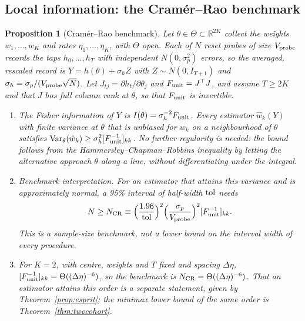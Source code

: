 \documentclass[12pt]{article}
\newtheorem{proposition}[theorem]{Proposition}
\theoremstyle{definition}
\theoremstyle{remark}
\newcommand{\R}{\mathbb{R}}
\begin{document}
\subsection{Local information: the Cram\'er--Rao benchmark}

\begin{proposition}[Cram\'er--Rao benchmark]\label{prop:crb}
Let $\theta\in\Theta\subset\R^{2K}$ collect the weights $w_1,\ldots,w_K$ and rates $\eta_1,\ldots,\eta_K$, with $\Theta$ open. Each of $N$ reset probes of size $V_{\rm probe}$ records the taps $h_0,\ldots,h_T$ with independent $N(0,\sigma_p^2)$ errors, so the averaged, rescaled record is $Y=h(\theta)+\sigma_hZ$ with $Z\sim N(0,I_{T+1})$ and $\sigma_h=\sigma_p/(V_{\rm probe}\sqrt N)$. Let $J_{tj}=\partial h_t/\partial\theta_j$ and $F_{\rm unit}=J^\top J$, and assume $T\ge2K$ and that $J$ has full column rank at $\theta$, so that $F_{\rm unit}$ is invertible.
\begin{enumerate}[label=(\roman*)]
\item The Fisher information of $Y$ is $I(\theta)=\sigma_h^{-2}F_{\rm unit}$. Every estimator $\hat w_k(Y)$ with finite variance at $\theta$ that is unbiased for $w_k$ on a neighbourhood of $\theta$ satisfies ${\rm Var}_\theta(\hat w_k)\ge\sigma_h^2[F_{\rm unit}^{-1}]_{kk}$. No further regularity is needed: the bound follows from the Hammersley--Chapman--Robbins inequality by letting the alternative approach $\theta$ along a line, without differentiating under the integral.
\item \emph{Benchmark interpretation.} For an estimator that attains this variance and is approximately normal, a 95\% interval of half-width ${\rm tol}$ needs
\begin{equation}\label{eq:Ncrb}
N\ge N_{\rm CR}\equiv\Bigl(\frac{1.96}{\rm tol}\Bigr)^2\Bigl(\frac{\sigma_p}{V_{\rm probe}}\Bigr)^2[F_{\rm unit}^{-1}]_{kk}.
\end{equation}
This is a sample-size benchmark, not a lower bound on the interval width of every procedure.
\item For $K=2$, with centre, weights and $T$ fixed and spacing $\Delta\eta$, $[F_{\rm unit}^{-1}]_{kk}=\Theta((\Delta\eta)^{-6})$, so the benchmark is $N_{\rm CR}=\Theta((\Delta\eta)^{-6})$. That an estimator attains this order is a separate statement, given by Theorem~\ref{prop:esprit}; the minimax lower bound of the same order is Theorem~\ref{thm:twocohort}.
\end{enumerate}
\end{proposition}
\end{document}
